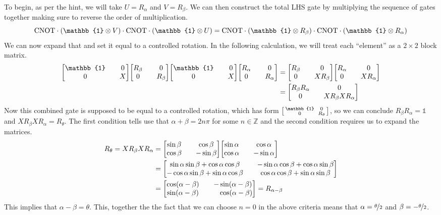 \documentclass[boxes,pages]{homework}
\begin{document}
\begin{solution}
	To begin, as per the hint, we will take $U = R_\alpha$ and $V = R_\beta$. We can then construct the total LHS gate by multiplying the sequence of gates together making sure to reverse the order of multiplication.
	\begin{equation*}
		\mathrm{CNOT}\cdot\qty(\mathbb{1}\otimes V)\cdot\mathrm{CNOT}\cdot\qty(\mathbb{1}\otimes U) = \mathrm{CNOT}\cdot\qty(\mathbb{1}\otimes R_\beta)\cdot\mathrm{CNOT}\cdot\qty(\mathbb{1}\otimes R_\alpha)
	\end{equation*}
	We can now expand that and set it equal to a controlled rotation. In the following calculation, we will treat each ``element'' as a $2\times 2$ block matrix.
	\begin{align*}
		\mqty[\mathbb{1} && 0 \\ 0 && X]\mqty[R_\beta && 0 \\ 0 && R_\beta]\mqty[\mathbb{1} && 0 \\ 0 && X]\mqty[R_\alpha && 0 \\ 0 && R_\alpha] &= \mqty[R_\beta && 0 \\ 0 && XR_\beta]\mqty[R_\alpha && 0 \\ 0 && XR_\alpha] \\
		&= \mqty[R_\beta R_\alpha && 0 \\ 0 && XR_\beta X R_\alpha]
	\end{align*}
	Now this combined gate is supposed to be equal to a controlled rotation, which has form $\smqty[\mathbb{1} && 0 \\ 0 && R_\theta]$, so we can conclude $R_\beta R_\alpha = \mathbb{1}$ and $XR_\beta X R_\alpha = R_\theta$. The first condition tells use that $\alpha + \beta = 2n\pi$ for some $n\in\mathbb{Z}$ and the second condition requires us to expand the matrices.
	\begin{align*}
		R_\theta = XR_\beta X R_\alpha &= \mqty[\sin\beta && \cos\beta \\ \cos\beta && -\sin\beta]\mqty[\sin\alpha && \cos\alpha \\ \cos\alpha && -\sin\alpha] \\
		&= \mqty[\sin\alpha\sin\beta + \cos\alpha\cos\beta && -\sin\alpha\cos\beta + \cos\alpha\sin\beta \\ -\cos\alpha\sin\beta + \sin\alpha\cos\beta && \cos\alpha\cos\beta + \sin\alpha\sin\beta] \\
		&= \mqty[\cos(\alpha - \beta) && -\sin(\alpha - \beta) \\ \sin(\alpha - \beta) && \phantom{-}\cos(\alpha - \beta)] = R_{\alpha - \beta}
	\end{align*}
	This implies that $\alpha - \beta = \theta$. This, together the the fact that we can choose $n = 0$ in the above criteria means that $\alpha = \nicefrac{\theta}{2}$ and $\beta = -\nicefrac{\theta}{2}$.
\end{solution}
\end{document}
